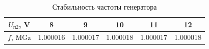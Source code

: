 \documentclass[a4paper]{article}
\begin{document}
\begin{enumerate}
    \begin{table}[H]
        \centering
        \begin{center}
        \end{center}
        \vspace{0.1cm}
        \begin{tabular}{|c|c|c|c|c|c|}
            \hline
            $U_{п2}$, V & 8&9&10&11&12 \\ 
            \hline
            $f$, MGz  &1.000016&  1.000017& 1.000018& 1.000017& 1.000018 \\ 
            \hline
            \end{tabular}
            \caption{Стабильность частоты генератора}
            \label{t5}
    \end{table}


\end{enumerate}
\end{document}
